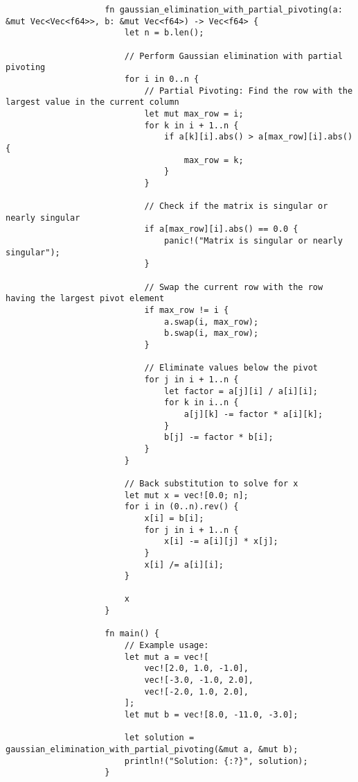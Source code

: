 \documentclass{article}
\begin{document}
                \begin{verbatim}
                    fn gaussian_elimination_with_partial_pivoting(a: &mut Vec<Vec<f64>>, b: &mut Vec<f64>) -> Vec<f64> {
                        let n = b.len();

                        // Perform Gaussian elimination with partial pivoting
                        for i in 0..n {
                            // Partial Pivoting: Find the row with the largest value in the current column
                            let mut max_row = i;
                            for k in i + 1..n {
                                if a[k][i].abs() > a[max_row][i].abs() {
                                    max_row = k;
                                }
                            }

                            // Check if the matrix is singular or nearly singular
                            if a[max_row][i].abs() == 0.0 {
                                panic!("Matrix is singular or nearly singular");
                            }

                            // Swap the current row with the row having the largest pivot element
                            if max_row != i {
                                a.swap(i, max_row);
                                b.swap(i, max_row);
                            }

                            // Eliminate values below the pivot
                            for j in i + 1..n {
                                let factor = a[j][i] / a[i][i];
                                for k in i..n {
                                    a[j][k] -= factor * a[i][k];
                                }
                                b[j] -= factor * b[i];
                            }
                        }

                        // Back substitution to solve for x
                        let mut x = vec![0.0; n];
                        for i in (0..n).rev() {
                            x[i] = b[i];
                            for j in i + 1..n {
                                x[i] -= a[i][j] * x[j];
                            }
                            x[i] /= a[i][i];
                        }

                        x
                    }

                    fn main() {
                        // Example usage:
                        let mut a = vec![
                            vec![2.0, 1.0, -1.0],
                            vec![-3.0, -1.0, 2.0],
                            vec![-2.0, 1.0, 2.0],
                        ];
                        let mut b = vec![8.0, -11.0, -3.0];

                        let solution = gaussian_elimination_with_partial_pivoting(&mut a, &mut b);
                        println!("Solution: {:?}", solution);
                    }

                \end{verbatim}
\end{document}
